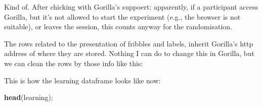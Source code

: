 \documentclass[
]{article}
\newenvironment{Shaded}{\begin{snugshade}}{\end{snugshade}}
\newcommand{\KeywordTok}[1]{\textcolor[rgb]{0.13,0.29,0.53}{\textbf{#1}}}
\newcommand{\NormalTok}[1]{#1}
\newcommand{\OperatorTok}[1]{\textcolor[rgb]{0.81,0.36,0.00}{\textbf{#1}}}
\newcommand{\StringTok}[1]{\textcolor[rgb]{0.31,0.60,0.02}{#1}}
\begin{document}
Kind of. After chicking with Gorilla's suppoert: apparently, if a
participant access Gorilla, but it's not allowed to start the experiment
(e.g., the browser is not suitable), or leaves the session, this counts
anyway for the randomisation.

The rows related to the presentation of fribbles and labels, inherit
Gorilla's http address of where they are stored. Nothing I can do to
change this in Gorilla, but we can clean the rows by those info like
this:

\begin{Shaded}
\end{Shaded}

This is how the learning dataframe looks like now:

\begin{Shaded}
\begin{Highlighting}[]
\KeywordTok{head}\NormalTok{(learning);}
\end{Highlighting}
\end{Shaded}
\end{document}
